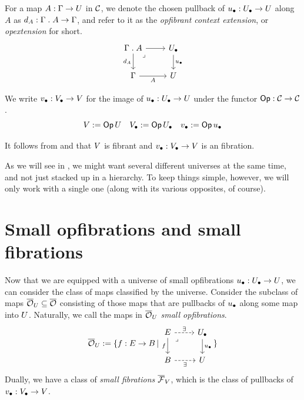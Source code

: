 For a map $A : \Gamma \to U$ in $\mathcal{C}$,
we denote the chosen pullback of ${u_\bullet} : {U_\bullet} \to U$ along
$A$ as $d_A : \Gamma \mathrel{.} A \to \Gamma$, and refer to it as the 
\emph{opfibrant context extension}, or \emph{opextension} for short.
\[ \begin{tikzcd}
    {\Gamma \opext A} & \Ulow \\
    \Gamma & \U
    \arrow[from=1-1, to=1-2]
    \arrow["{d_A}"', from=1-1, to=2-1]
    \arrow["\lrcorner"{anchor=center, pos=0.125}, draw=none, from=1-1, to=2-2]
    \arrow["\ulow", from=1-2, to=2-2]
    \arrow["A"', from=2-1, to=2-2]
  \end{tikzcd}\]

\begin{definition}
  We write ${v_\bullet} : {V_\bullet} \to V$ for
  the image of ${u_\bullet} : {U_\bullet} \to U$ under the functor
  $\mathop{\mathsf{Op}} : \mathcal{C} \to \mathcal{C}$.
  \[
    V := \mathop{\mathsf{Op}}{U} \quad
    {V_\bullet} := \mathop{\mathsf{Op}}{{U_\bullet}} \quad
    {v_\bullet} := \mathop{\mathsf{Op}}{{u_\bullet}}
  \]
\end{definition}

It follows from  and  that
$V$ is fibrant and ${v_\bullet} : {V_\bullet} \to V$ is an fibration.

As we will see in ,
we might want several different universes at the same time,
and not just stacked up in a hierarchy.
To keep things simple, however,
we will only work with a single one 
(along with its various opposites, of course).

\section*{Small opfibrations and small fibrations}
Now that we are equipped with a universe of small opfibrations
${u_\bullet} : {U_\bullet} \to U$,
we can consider the class of maps classified by the universe.
Consider the subclass of maps ${\overline{{\mathcal{O}}}}_U \subseteq {\overline{{\mathcal{O}}}}$
consisting of those maps that are pullbacks of ${u_\bullet}$
along some map into $U$.
Naturally, we call the maps in ${\overline{{\mathcal{O}}}}_U$ \emph{small opfibrations}.
\[
  \opfib_\U := \{ f : E \to B \st \begin{tikzcd}
	E & \Ulow \\
	B & \U
	\arrow["\exists", dashed, from=1-1, to=1-2]
	\arrow["f"', from=1-1, to=2-1]
	\arrow["\lrcorner"{anchor=center, pos=0.125}, draw=none, from=1-1, to=2-2]
	\arrow["\ulow", from=1-2, to=2-2]
	\arrow["\exists"', dashed, from=2-1, to=2-2]
\end{tikzcd}\}
\]
Dually, we have a class of \emph{small fibrations} ${\overline{{\mathcal{F}}}}_V$,
which is the class of pullbacks of ${v_\bullet} : {V_\bullet} \to V$.

